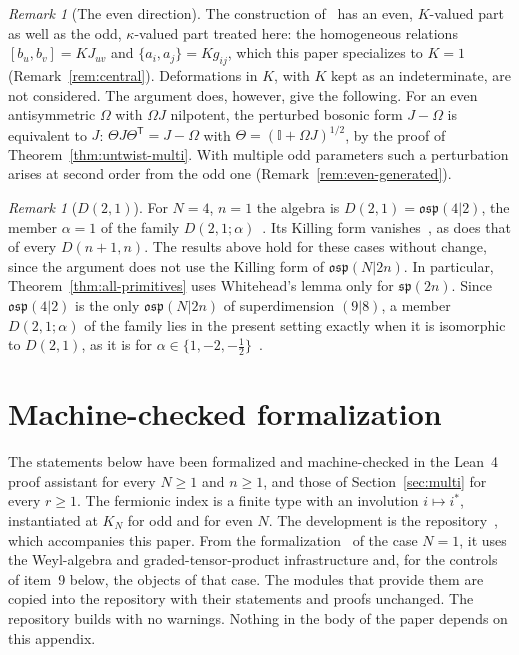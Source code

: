 \documentclass[11pt]{article}
\numberwithin{equation}{section}
\theoremstyle{definition}
\theoremstyle{remark}
\newtheorem{remark}[theorem]{Remark}
\newcommand{\osp}{\mathfrak{osp}}
\begin{document}
\begin{remark}[The even direction]\label{rem:even}
The construction of~\cite[Section~4]{BS17} has an even, $K$-valued part as well as the
odd, $\kappa$-valued part treated here: the homogeneous relations $[b_u,b_v]=KJ_{uv}$ and
$\{a_i,a_j\}=Kg_{ij}$, which this paper specializes to $K=1$ (Remark~\ref{rem:central}).
Deformations in $K$, with $K$ kept as an indeterminate, are not considered. The argument does,
however, give the following. For an even antisymmetric $\Omega$ with $\Omega J$ nilpotent,
the perturbed bosonic form $J-\Omega$ is equivalent to $J$: $\Theta J\Theta^{\mathsf T}=J-\Omega$
with $\Theta=(\mathbb I+\Omega J)^{1/2}$, by the proof of Theorem~\ref{thm:untwist-multi}. With
multiple odd parameters such a perturbation arises at second order from the odd one
(Remark~\ref{rem:even-generated}).
\end{remark}

\begin{remark}[$D(2,1)$]\label{rem:d21}
For $N=4$, $n=1$ the algebra is $D(2,1)=\osp(4|2)$, the member $\alpha=1$ of the family
$D(2,1;\alpha)$~\cite[\S2.20]{FSS00}. Its Killing form vanishes~\cite[\S2.23]{FSS00}, as does that of every $D(n+1,n)$. The results above hold for
these cases without change, since the argument does not use the Killing form of
$\osp(N|2n)$. In particular, Theorem~\ref{thm:all-primitives} uses Whitehead's lemma only for
$\mathfrak{sp}(2n)$. Since $\osp(4|2)$ is
the only $\osp(N|2n)$ of superdimension $(9|8)$, a member $D(2,1;\alpha)$ of the family lies in
the present setting exactly when it is isomorphic to $D(2,1)$, as it is for
$\alpha\in\{1,-2,-\tfrac12\}$~\cite[\S2.20]{FSS00}.
\end{remark}

\appendix

\section{Machine-checked formalization}\label{sec:formalization}

The statements below have been formalized and machine-checked in the Lean~4 proof
assistant for every $N\geq1$ and $n\geq1$, and those of
Section~\ref{sec:multi} for every $r\geq1$. The fermionic index is a finite
type with an involution $i\mapsto i^*$, instantiated at $K_N$ for odd and for even $N$.
The development is the repository~\cite{Dev}, which accompanies this paper. From the formalization~\cite{Repo} of the case $N=1$, it uses the Weyl-algebra and
graded-tensor-product infrastructure and, for the controls of item~9 below, the objects of that case.
The modules that provide them are copied into the repository with their statements and proofs
unchanged. The repository builds with no warnings. Nothing in the body of the paper depends on this appendix.
\end{document}
